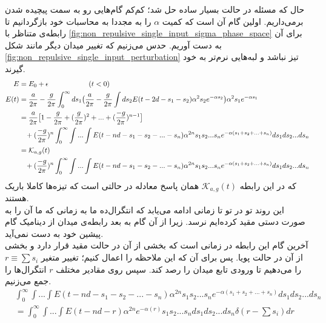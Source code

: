 حال که مسئله در حالت بسیار ساده حل شد؛ کم‌کم گام‌هایی رو به سمت پیچیده شدن برمی‌داریم. اولین گام آن است که کمیت $\alpha$ را به مجددا به محاسبات خود بازگردانیم تا رابطه‌ی متناظر با
\ref{fig:non_repulsive_single_input_sigma_phase_space}
برای آن به دست آوریم. حدس می‌زنیم که تغییر میدان دیگر مانند شکل 
\ref{fig:non_repulsive_single_input_perturbation}
تیز نباشد و لبه‌هایی نرم‌تر به خود گیرند.
\begin{align}
	E &= E_0 + \epsilon \hspace{2cm} (t<0) \\
	E(t) &= \frac{a}{2\pi} - \frac{g}{2\pi} \int_{0}^{\infty} ds_1 \big( \frac{a}{2\pi} - \frac{g}{2\pi} \int ds_2 E(t - 2d - s_1 - s_2) \alpha^2 s_2 e^{-\alpha s_2} \big) \alpha^2 s_1 e^{-\alpha s_1} \\
	&= \frac{a}{2\pi} \big[ 1 - \frac{g}{2\pi} + (\frac{g}{2\pi})^2 + ... + (\frac{-g}{2\pi})^{n - 1} \big] \\
	&\hspace{3mm}+ (\frac{-g}{2\pi})^{n} \int_{0}^{\infty}\int ... \int E(t - nd - s_1 - s_2 - ... - s_n) \alpha^{2n} s_1 s_2 ... s_n e^{-\alpha(s_1 + s_2 + ... + s_n)} ds_1 ds_2 ... ds_n\\
	&= \mathcal{K}_{a,g}(t)\\
	&\hspace{3mm}+ (\frac{-g}{2\pi})^{n} \int_{0}^{\infty}\int ... \int E(t - nd - s_1 - s_2 - ... - s_n) \alpha^{2n} s_1 s_2 ... s_n e^{-\alpha(s_1 + s_2 + ... + s_n)} ds_1 ds_2 ... ds_n
\end{align}
که در این رابطه 
$\mathcal{K}_{a,g}(t)$
همان پاسخ معادله در حالتی است که تیزه‌ها کاملا باریک هستند. \\
این روند تو در تو تا زمانی ادامه می‌یابد که انتگرال‌ده ما به زمانی که ما آن را به صورت دستی مقید کرده‌ایم نرسد. زیرا از آن گام به بعد رابطه‌ی میدان از دینامیک گام پیشین خود به دست نمی‌آید.\\
آخرین گام این رابطه در زمانی است که بخشی از آن در حالت مقید قرار دارد و بخشی از آن در حالت پویا. پس برای آن که این ملاحظه را اعمال کنیم؛ تغییر متغیر
$r \equiv \sum s_i$
را می‌دهیم تا ورودی تابع میدان را رصد کند. سپس روی مقادیر مختلف $r$ انتگرال‌ها را جمع می‌زنیم.
\begin{align}
	& \int_{0}^{\infty}\int ... \int E(t - nd - s_1 - s_2 - ... - s_n)
	\alpha^{2n} s_1 s_2 ... s_n  e^{-\alpha(s_1 + s_2 + ... + s_n)} ds_1 ds_2 ... ds_n\\
	&= \int_{0}^{\infty}\int ... \int E(t - nd - r) \alpha^{2n} e^{-\alpha(r)} s_1 s_2 ... s_n ds_1 ds_2 ... ds_n \delta(r-\sum s_i) dr
\end{align}
